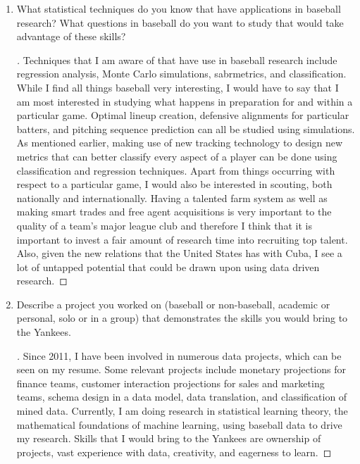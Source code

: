 \documentclass[]{article}
\theoremstyle{definition}
\begin{document}
\begin{enumerate}
\begin{proof}[\unskip\nopunct]
\end{proof}

\item What statistical techniques do you know that have applications in baseball research? What questions in baseball do you want to study that would take advantage of these skills?
\begin{proof}[\unskip\nopunct]\renewcommand{\qedsymbol}{}

Techniques that I am aware of that have use in baseball research include regression analysis, Monte Carlo simulations, sabrmetrics, and classification. While I find all things baseball very interesting, I would have to say that I am most interested in studying what happens in preparation for and within a particular game. Optimal lineup creation, defensive alignments for particular batters, and pitching sequence prediction can all be studied using simulations. As mentioned earlier, making use of new tracking technology to design new metrics that can better classify every aspect of a player can be done using classification and regression techniques. Apart from things occurring with respect to a particular game, I would also be interested in scouting, both nationally and internationally. Having a talented farm system as well as making smart trades and free agent acquisitions is very important to the quality of a team's major league club and therefore I think that it is important to invest a fair amount of research time into recruiting top talent. Also, given the new relations that the United States has with Cuba, I see a lot of untapped potential that could be drawn upon using data driven research.

\end{proof}

\item Describe a project you worked on (baseball or non-baseball, academic or personal, solo or in a group) that demonstrates the skills you would bring to the Yankees.

\begin{proof}[\unskip\nopunct]\renewcommand{\qedsymbol}{}
	Since 2011, I have been involved in numerous data projects, which can be seen on my resume. Some relevant projects include monetary projections for finance teams, customer interaction projections for sales and marketing teams, schema design in a data model, data translation, and classification of mined data. Currently, I am doing research in statistical learning theory, the mathematical foundations of machine learning, using baseball data to drive my research. Skills that I would bring to the Yankees are ownership of projects, vast experience with data, creativity, and eagerness to learn. 


\end{proof}
\end{enumerate}
\end{document}
